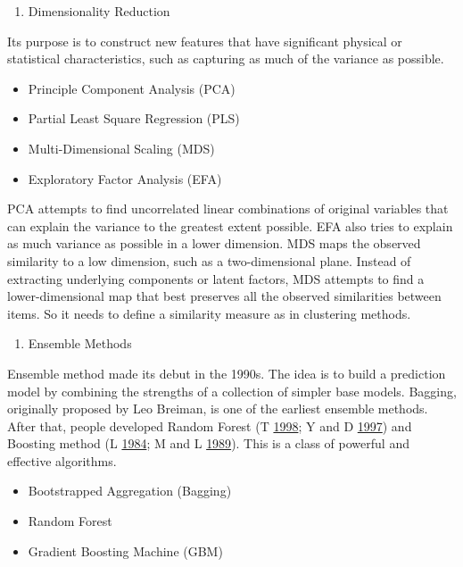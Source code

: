 \documentclass[
]{article}
\providecommand{\tightlist}{%
  \setlength{\itemsep}{0pt}\setlength{\parskip}{0pt}}
\begin{document}
\begin{enumerate}
\def\labelenumi{\arabic{enumi}.}
\setcounter{enumi}{11}
\tightlist
\item
  Dimensionality Reduction
\end{enumerate}

Its purpose is to construct new features that have significant physical
or statistical characteristics, such as capturing as much of the
variance as possible.

\begin{itemize}
\tightlist
\item
  Principle Component Analysis (PCA)
\item
  Partial Least Square Regression (PLS)
\item
  Multi-Dimensional Scaling (MDS)
\item
  Exploratory Factor Analysis (EFA)
\end{itemize}

PCA attempts to find uncorrelated linear combinations of original
variables that can explain the variance to the greatest extent possible.
EFA also tries to explain as much variance as possible in a lower
dimension. MDS maps the observed similarity to a low dimension, such as
a two-dimensional plane. Instead of extracting underlying components or
latent factors, MDS attempts to find a lower-dimensional map that best
preserves all the observed similarities between items. So it needs to
define a similarity measure as in clustering methods.

\begin{enumerate}
\def\labelenumi{\arabic{enumi}.}
\setcounter{enumi}{12}
\tightlist
\item
  Ensemble Methods
\end{enumerate}

Ensemble method made its debut in the 1990s. The idea is to build a
prediction model by combining the strengths of a collection of simpler
base models. Bagging, originally proposed by Leo Breiman, is one of the
earliest ensemble methods. After that, people developed Random Forest (T
\protect\hyperlink{ref-Ho1998}{1998}; Y and D
\protect\hyperlink{ref-amit1997}{1997}) and Boosting method (L
\protect\hyperlink{ref-Valiant1984}{1984}; M and L
\protect\hyperlink{ref-KV1989}{1989}). This is a class of powerful and
effective algorithms.

\begin{itemize}
\tightlist
\item
  Bootstrapped Aggregation (Bagging)
\item
  Random Forest
\item
  Gradient Boosting Machine (GBM)
\end{itemize}
\end{document}
